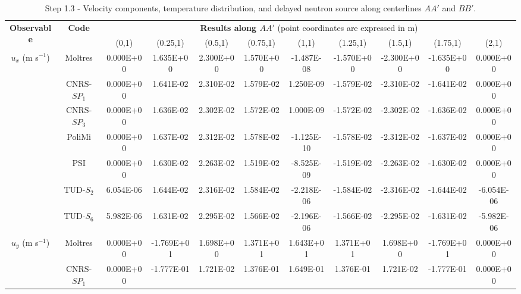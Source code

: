\begin{table}[htbp!]
	\caption{Step 1.3 - Velocity components, temperature distribution, and delayed neutron source along centerlines $AA'$ and $BB'$.}
	\centering
	\footnotesize
	\setlength\tabcolsep{1.5pt}
	\hspace*{-2cm}
	\renewcommand{\arraystretch}{.63}
	\begin{tabular}{c c c c c c c c c c c}
        \toprule
		\multirow{2}{*}{\textbf{Observable}} & \multirow{2}{*}{\textbf{Code}} & \multicolumn{9}{c}{\textbf{Results along $AA'$} (point coordinates are expressed in m)} \\
		& & {(0,1)} & {(0.25,1)} & {(0.5,1)} & {(0.75,1)} & {(1,1)} & {(1.25,1)} & {(1.5,1)} & {(1.75,1)} & {(2,1)} \\
        \midrule
        \multirow{7}{*}{$u_x$ (m s$^{-1}$)} & Moltres    &   0.000E+00 &   1.635E+00 &   2.300E+00 &   1.570E+00 &  -1.487E-08 &  -1.570E+00 &  -2.300E+00 &  -1.635E+00 &   0.000E+00 \\
        & CNRS-$SP_1$   &   0.000E+00 &   1.641E-02 &   2.310E-02 &   1.579E-02 &   1.250E-09 &  -1.579E-02 &  -2.310E-02 &  -1.641E-02 &   0.000E+00 \\
        & CNRS-$SP_3$   &   0.000E+00 &   1.636E-02 &   2.302E-02 &   1.572E-02 &   1.000E-09 &  -1.572E-02 &  -2.302E-02 &  -1.636E-02 &   0.000E+00 \\
        & PoliMi     &   0.000E+00 &   1.637E-02 &   2.312E-02 &   1.578E-02 &  -1.125E-10 &  -1.578E-02 &  -2.312E-02 &  -1.637E-02 &   0.000E+00 \\
        & PSI        &   0.000E+00 &   1.630E-02 &   2.263E-02 &   1.519E-02 &  -8.525E-09 &  -1.519E-02 &  -2.263E-02 &  -1.630E-02 &   0.000E+00 \\
        & TUD-$S_2$     &   6.054E-06 &   1.644E-02 &   2.316E-02 &   1.584E-02 &  -2.218E-06 &  -1.584E-02 &  -2.316E-02 &  -1.644E-02 &  -6.054E-06 \\
        & TUD-$S_6$     &   5.982E-06 &   1.631E-02 &   2.295E-02 &   1.566E-02 &  -2.196E-06 &  -1.566E-02 &  -2.295E-02 &  -1.631E-02 &  -5.982E-06 \\
        \midrule
        \multirow{7}{*}{$u_y$ (m s$^{-1}$)} & Moltres    &   0.000E+00 &  -1.769E+01 &   1.698E+00 &   1.371E+01 &   1.643E+01 &   1.371E+01 &   1.698E+00 &  -1.769E+01 &   0.000E+00 \\
        & CNRS-$SP_1$   &   0.000E+00 &  -1.777E-01 &   1.721E-02 &   1.376E-01 &   1.649E-01 &   1.376E-01 &   1.721E-02 &  -1.777E-01 &   0.000E+00 \\

\end{tabular}
\end{table}

